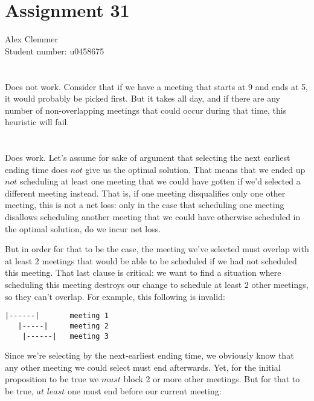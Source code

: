\documentclass[a4paper]{article}
\begin{document}
\section*{Assignment 31}
Alex Clemmer\\
Student number: u0458675

\section{}

Does not work. Consider that if we have a meeting that starts at 9 and ends at 5, it would probably be picked first. But it takes all day, and if there are any number of non-overlapping meetings that could occur during that time, this heuristic will fail.

\section{}

Does work. Let's assume for sake of argument that selecting the next earliest ending time does $\textit{not}$ give us the optimal solution. That means that we ended up $\textit{not}$ scheduling at least one meeting that we could have gotten if we'd selected a different meeting instead. That is, if one meeting disqualifies only one other meeting, this is not a net loss: only in the case that scheduling one meeting disallows scheduling another meeting that we could have otherwise scheduled in the optimal solution, do we incur net loss.

But in order for that to be the case, the meeting we've selected must overlap with at least $\textit{2}$ meetings that would be able to be scheduled if we had not scheduled this meeting. That last clause is critical: we want to find a situation where scheduling this meeting destroys our change to schedule at least 2 other meetings, so they can't overlap. For example, this following is invalid:

\begin{verbatim}
|------|       meeting 1
   |-----|     meeting 2
    |------|   meeting 3
\end{verbatim}

Since we're selecting by the next-earliest ending time, we obviously know that any other meeting we could select must end afterwards. Yet, for the initial proposition to be true we $\textit{must}$ block 2 or more other meetings. But for that to be true, $\textit{at least}$ one must end before our current meeting:
\end{document}
